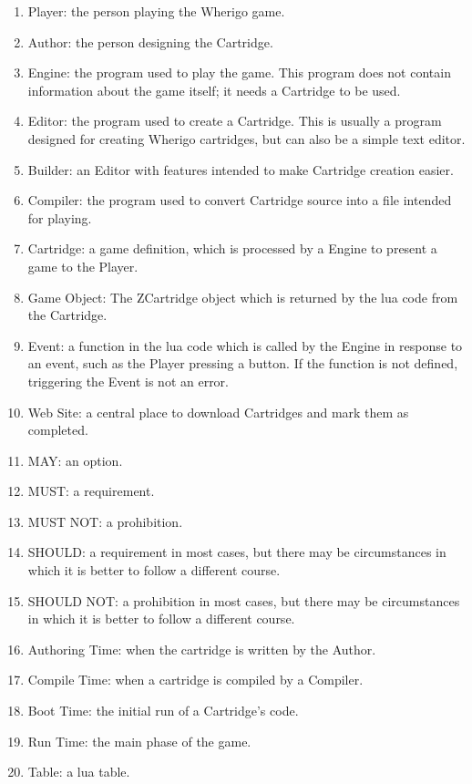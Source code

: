 \documentclass{article}
\begin{document}
\begin{enumerate}
	\item Player: the person playing the Wherigo game.
	\item Author: the person designing the Cartridge.
	\item Engine: the program used to play the game. This program does not contain information about the game itself; it needs a Cartridge to be used.
	\item Editor: the program used to create a Cartridge. This is usually a program designed for creating Wherigo cartridges, but can also be a simple text editor.
	\item Builder: an Editor with features intended to make Cartridge creation easier.
	\item Compiler: the program used to convert Cartridge source into  a file intended for playing.
	\item Cartridge: a game definition, which is processed by a Engine to present a game to the Player.
	\item Game Object: The ZCartridge object which is returned by the lua code from the Cartridge.
	\item Event: a function in the lua code which is called by the Engine in response to an event, such as the Player pressing a button. If the function is not defined, triggering the Event is not an error.
	\item Web Site: a central place to download Cartridges and mark them as completed.
	\item MAY: an option.
	\item MUST: a requirement.
	\item MUST NOT: a prohibition.
	\item SHOULD: a requirement in most cases, but there may be circumstances in which it is better to follow a different course.
	\item SHOULD NOT: a prohibition in most cases, but there may be circumstances in which it is better to follow a different course.
	\item Authoring Time: when the cartridge is written by the Author.
	\item Compile Time: when a cartridge is compiled by a Compiler.
	\item Boot Time: the initial run of a Cartridge's code.
	\item Run Time: the main phase of the game.
	\item Table: a lua table.
\end{enumerate}
\end{document}
